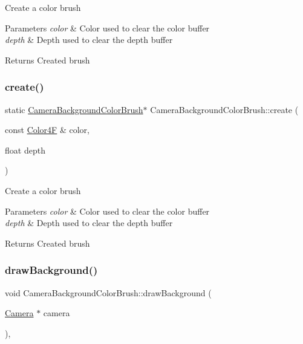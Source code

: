 Create a color brush 
\begin{DoxyParams}{Parameters}
{\em color} & Color used to clear the color buffer \\
\hline
{\em depth} & Depth used to clear the depth buffer \\
\hline
\end{DoxyParams}
\begin{DoxyReturn}{Returns}
Created brush 
\end{DoxyReturn}
\mbox{\label{classCameraBackgroundColorBrush_a2842107f9ebac9204075d259b66176f0}} 
\subsubsection{\texorpdfstring{create()}{create()}\hspace{0.1cm}{\footnotesize\ttfamily [2/2]}}
{\footnotesize\ttfamily static \hyperlink{classCameraBackgroundColorBrush}{Camera\+Background\+Color\+Brush}$\ast$ Camera\+Background\+Color\+Brush\+::create (\begin{DoxyParamCaption}\item[{const \hyperlink{structColor4F}{Color4F} \&}]{color,  }\item[{float}]{depth }\end{DoxyParamCaption})\hspace{0.3cm}{\ttfamily [static]}}

Create a color brush 
\begin{DoxyParams}{Parameters}
{\em color} & Color used to clear the color buffer \\
\hline
{\em depth} & Depth used to clear the depth buffer \\
\hline
\end{DoxyParams}
\begin{DoxyReturn}{Returns}
Created brush 
\end{DoxyReturn}
\mbox{\label{classCameraBackgroundColorBrush_aa07e5c7ea9d5c233c51920bf75d1381b}} 
\subsubsection{\texorpdfstring{draw\+Background()}{drawBackground()}}
{\footnotesize\ttfamily void Camera\+Background\+Color\+Brush\+::draw\+Background (\begin{DoxyParamCaption}\item[{\hyperlink{classCamera}{Camera} $\ast$}]{camera }\end{DoxyParamCaption})\hspace{0.3cm}{\ttfamily [override]}, {\ttfamily [virtual]}}

